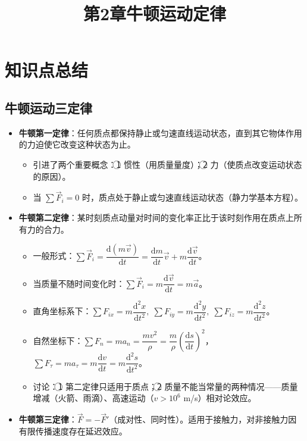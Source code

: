 \documentclass[12pt,a4paper]{ctexart}
\title{第2章\quad 牛顿运动定律}
\author{}
\date{}
\begin{document}
\maketitle

\section{知识点总结}

\subsection{牛顿运动三定律}

\begin{itemize}
    \item \textbf{牛顿第一定律}：任何质点都保持静止或匀速直线运动状态，直到其它物体作用的力迫使它改变这种状态为止。
    \begin{itemize}
        \item 引进了两个重要概念：\textcircled{1} 惯性（用质量量度）；\textcircled{2} 力（使质点改变运动状态的原因）。
        \item 当 $\sum \vec{F}_i = 0$ 时，质点处于静止或匀速直线运动状态（静力学基本方程）。
    \end{itemize}
    \item \textbf{牛顿第二定律}：某时刻质点动量对时间的变化率正比于该时刻作用在质点上所有力的合力。
    \begin{itemize}
        \item 一般形式：$\displaystyle\sum \vec{F}_i = \dfrac{\mathrm{d}(m\vec{v})}{\mathrm{d}t} = \dfrac{\mathrm{d}m}{\mathrm{d}t}\vec{v} + m\dfrac{\mathrm{d}\vec{v}}{\mathrm{d}t}$。
        \item 当质量不随时间变化时：$\displaystyle\sum \vec{F}_i = m\dfrac{\mathrm{d}\vec{v}}{\mathrm{d}t} = m\vec{a}$。
        \item 直角坐标系下：$\sum F_{ix} = m\dfrac{\mathrm{d}^2 x}{\mathrm{d}t^2},\; \sum F_{iy} = m\dfrac{\mathrm{d}^2 y}{\mathrm{d}t^2},\; \sum F_{iz} = m\dfrac{\mathrm{d}^2 z}{\mathrm{d}t^2}$。
        \item 自然坐标下：$\displaystyle\sum F_n = ma_n = \dfrac{mv^2}{\rho} = \dfrac{m}{\rho}\!\left(\dfrac{\mathrm{d}s}{\mathrm{d}t}\right)^{\!2}$，$\displaystyle\sum F_\tau = ma_\tau = m\dfrac{\mathrm{d}v}{\mathrm{d}t} = m\dfrac{\mathrm{d}^2 s}{\mathrm{d}t^2}$。
        \item 讨论：\textcircled{1} 第二定律只适用于质点；\textcircled{2} 质量不能当常量的两种情况——质量增减（火箭、雨滴）、高速运动（$v>10^6$ m/s）相对论效应。
    \end{itemize}
    \item \textbf{牛顿第三定律}：$\vec{F} = -\vec{F}'$（成对性、同时性）。适用于接触力，对非接触力因有限传播速度存在延迟效应。
\end{itemize}
\end{document}
